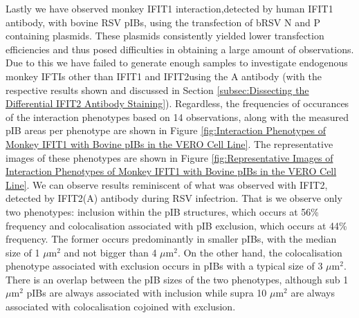Lastly we have observed monkey IFIT1 interaction,detected by human IFIT1 antibody, with bovine RSV pIBs, using the transfection of bRSV N and P containing plasmids. These plasmids consistently yielded lower transfection efficiencies and thus posed difficulties in obtaining a large amount of observations. Due to this we have failed to generate enough samples to investigate endogenous monkey IFTIs other than IFIT1 and IFIT2using the A antibody (with the respective results shown and discussed in Section \ref{subsec:Dissecting the Differential IFIT2 Antibody Staining}). Regardless, the frequencies of occurances of the interaction phenotypes based on 14 observations, along with the measured pIB areas per phenotype are shown in Figure \ref{fig:Interaction Phenotypes of Monkey IFIT1 with Bovine pIBs in the VERO Cell Line}. The representative images of these phenotypes are shown in Figure \ref{fig:Representative Images of Interaction Phenotypes of Monkey IFIT1 with Bovine pIBs in the VERO Cell Line}. We can observe results reminiscent of what was observed with IFIT2, detected by IFIT2(A) antibody during RSV infectrion. That is we observe only two phenotypes: inclusion within the pIB structures, which occurs at 56\% frequency and colocalisation associated with pIB exclusion, which occurs at 44\% frequency. The former occurs predominantly in smaller pIBs, with the median size of 1 \(\mu \mbox{m}^2\) and not bigger than 4 \(\mu \mbox{m}^2\). On the other hand, the colocalisation phenotype associated with exclusion occurs in pIBs with a typical size of 3 \(\mu \mbox{m}^2\). There is an overlap between the pIB sizes of the two phenotypes, although sub 1 \(\mu \mbox{m}^2\) pIBs are always associated with inclusion while supra 10 \(\mu \mbox{m}^2\) are always associated with colocalisation cojoined with exclusion.

